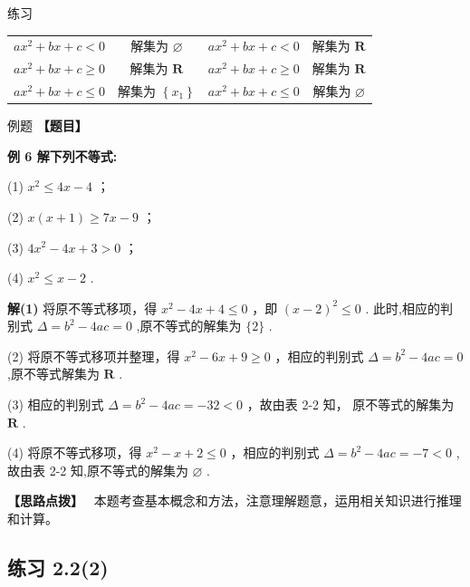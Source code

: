 \documentclass[a4paper,10pt,oneside,fontset=none]{ctexbook}
\renewcommand{\geq}{\geqslant}
\renewcommand{\leq}{\leqslant}
\newcounter{example}[chapter]
\newenvironment{example}[1][]{\begin{exBox}{例题}{#1}}{\end{exBox}}
\newenvironment{exercise}[1][]{\begin{exBox}{练习}{#1}}{\end{exBox}}
\numberwithin{equation}{chapter}
\newenvironment{solution}{\begin{solutionBox}}{\end{solutionBox}}
\newenvironment{hint}{\begin{hintBox}\textbf{【思路点拨】}~}{\end{hintBox}}
\begin{document}
\begin{exercise}
\begin{center}
\begin{tabular}{|c|c|c|c|}
$a{x}^{2} + {bx} + c < 0$ & 解集为 $\varnothing$ & $a{x}^{2} + {bx} + c < 0$ & 解集为 $\mathbf{R}$ \\
$a{x}^{2} + {bx} + c \geq  0$ & 解集为 $\mathbf{R}$ & $a{x}^{2} + {bx} + c \geq  0$ & 解集为 $\mathbf{R}$ \\
$a{x}^{2} + {bx} + c \leq  0$ & 解集为 $\left\{  {x}_{1}\right\}$ & $a{x}^{2} + {bx} + c \leq  0$ & 解集为 $\varnothing$ \\
\hline
\end{tabular}
\end{center}
\end{exercise}

\begin{example}
\textbf{【题目】}\par\vspace{0.3em}
\textbf{例 6 解下列不等式:}\par\vspace{0.3em}
\par
(1)  ${x}^{2} \leq  {4x} - 4$ ；
\par
(2)  $x\left( {x + 1}\right)  \geq  {7x} - 9$ ；
\par
(3)  $4{x}^{2} - {4x} + 3 > 0$ ；
\par
(4)  ${x}^{2} \leq  x - 2$ .
\end{example}

\begin{solution}
\textbf{解(1)} 将原不等式移项，得 ${x}^{2} - {4x} + 4 \leq  0$ ，即 ${\left( x - 2\right) }^{2} \leq  0$ . 此时,相应的判别式 $\Delta  = {b}^{2} - {4ac} = 0$ ,原不等式的解集为 $\{ 2\}$ .
\par
(2) 将原不等式移项并整理，得 ${x}^{2} - {6x} + 9 \geq  0$ ，相应的判别式 $\Delta  = {b}^{2} - {4ac} = 0$ ,原不等式解集为 $\mathbf{R}$ .
\par
(3) 相应的判别式 $\Delta  = {b}^{2} - {4ac} =  - {32} < 0$ ，故由表 2-2 知， 原不等式的解集为 $\mathbf{R}$ .
\par
(4) 将原不等式移项，得 ${x}^{2} - x + 2 \leq  0$ ，相应的判别式 $\Delta  = {b}^{2} - {4ac} =  - 7 < 0$ ,故由表 2-2 知,原不等式的解集为 $\varnothing$ .
\end{solution}

\begin{hint}
本题考查基本概念和方法，注意理解题意，运用相关知识进行推理和计算。
\end{hint}

\subsection*{练习 2.2(2)}
\end{document}
